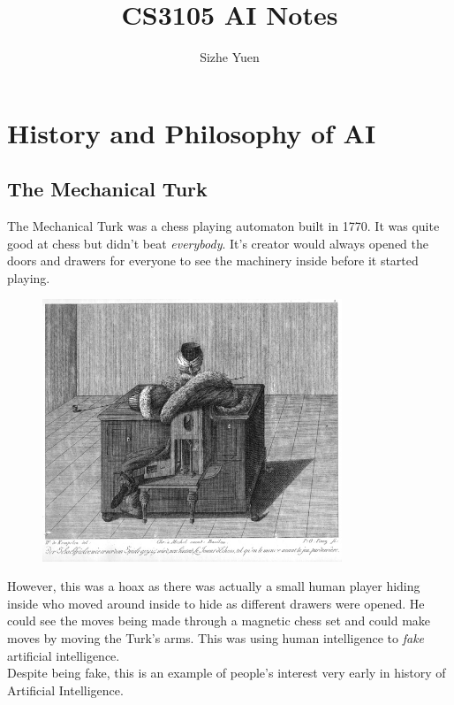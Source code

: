 \documentclass{article}
\title{CS3105 AI Notes}
\author{Sizhe Yuen}
\newcommand{\n}[0]{\\[\baselineskip]}
\begin{document}
\tableofcontents

\section{History and Philosophy of AI}
\subsection{The Mechanical Turk}
The Mechanical Turk was a chess playing automaton built in 1770. It was quite good at chess but didn't beat \textit{everybody}. It's creator would always opened the doors and drawers for everyone to see the machinery inside before it started playing.
\begin{figure}[H]
\centering
\includegraphics[width=0.8\textwidth, keepaspectratio]{imgs/turk.jpg}
\end{figure}
\noindent
However, this was a hoax as there was actually a small human player hiding inside who moved around inside to hide as different drawers were opened. He could see the moves being made through a magnetic chess set and could make moves by moving the Turk's arms. This was using human intelligence to \textit{fake} artificial intelligence.
\n
Despite being fake, this is an example of people's interest very early in history of Artificial Intelligence.
\end{document}
